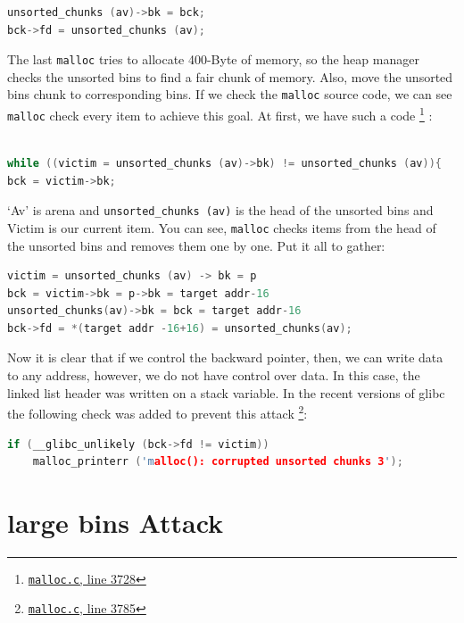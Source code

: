 \documentclass{masterthesis}
\newcommand*\libc{glibc}
\newcommand*\ub{unsorted bins}
\newcommand*\lb{large bins}
\newcommand*\mallocc{\lstinline{malloc}}
\begin{document}
\begin{lstlisting}[language=c,frame=tlrb]
unsorted_chunks (av)->bk = bck;
bck->fd = unsorted_chunks (av);
\end{lstlisting}

The last \mallocc{} tries to allocate 400-Byte of memory, so the heap manager checks the \ub{} to find a fair chunk of memory. Also, move the \ub{} chunk to corresponding bins. If we check the \mallocc{} source code, we can see \mallocc{} check every item to achieve this goal. At first, we have such a code \footnote{\href{https://sourceware.org/git/?p=glibc.git;a=blob;f=malloc/malloc.c;h=f7cd29bc2f93e1082ee77800bd64a4b2a2897055;hb=9ea3686266dca3f004ba874745a4087a89682617\#l3728}{\texttt{malloc.c}, line 3728}} :
\begin{lstlisting}[language=c,frame=tlrb]

while ((victim = unsorted_chunks (av)->bk) != unsorted_chunks (av)){
bck = victim->bk;
\end{lstlisting}
‘Av’ is arena and \lstinline{unsorted_chunks (av)} is the head of the \ub{} and Victim is our current item. You can see, \mallocc{} checks items from the head of the \ub{} and removes them one by one. Put it all to gather:

\begin{lstlisting}[language=c,frame=tlrb]
victim = unsorted_chunks (av) -> bk = p
bck = victim->bk = p->bk = target addr-16
unsorted_chunks(av)->bk = bck = target addr-16
bck->fd = *(target addr -16+16) = unsorted_chunks(av);
\end{lstlisting}

Now it is clear that if we control the backward pointer, then, we can write data to any address, however, we do not have control over data. In this case, the linked list header was written on a stack variable. In the recent versions of \libc{} the following check was added to prevent this attack \footnote{\href{https://sourceware.org/git/?p=glibc.git;a=blob;f=malloc/malloc.c;h=f7cd29bc2f93e1082ee77800bd64a4b2a2897055;hb=9ea3686266dca3f004ba874745a4087a89682617\#l3785}{\texttt{malloc.c}, line 3785}}:

\begin{lstlisting}[language=c,frame=tlrb]
if (__glibc_unlikely (bck->fd != victim))
	malloc_printerr ('malloc(): corrupted unsorted chunks 3');
\end{lstlisting}

\section{\lb{} Attack}
\end{document}
